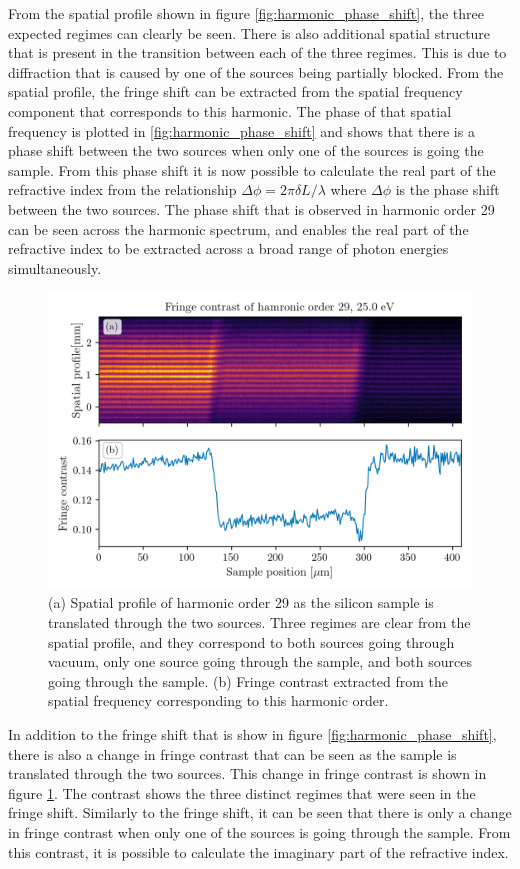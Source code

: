 From the spatial profile shown in figure \ref{fig:harmonic_phase_shift}, the three expected regimes can clearly be seen.  There is also additional spatial structure that is present in the transition between each of the three regimes.  This is due to diffraction that is caused by one of the sources being partially blocked.  From the spatial profile, the fringe shift can be extracted from the spatial frequency component that corresponds to this harmonic.  The phase of that spatial frequency is plotted in \ref{fig:harmonic_phase_shift} and shows that there is a phase shift between the two sources when only one of the sources is going the sample.  From this phase shift it is now possible to calculate the real part of the refractive index from the relationship $\Delta \phi = 2\pi\delta L/\lambda$ where $\Delta \phi$ is the phase shift between the two sources.  The phase shift that is observed in harmonic order 29 can be seen across the harmonic spectrum, and enables the real part of the refractive index to be extracted across a broad range of photon energies simultaneously.

\begin{figure}
	\centering
	\includegraphics[width=1.0\textwidth]{figures/refractive_index/spatialgram_fringe_contrast.png}
	\caption{(a) Spatial profile of harmonic order 29 as the silicon sample is translated through the two sources. Three regimes are clear from the spatial profile, and they correspond to both sources going through vacuum, only one source going through the sample, and both sources going through the sample. (b) Fringe contrast extracted from the spatial frequency corresponding to this harmonic order.}
	\label{fig:harmonic_fringe_contrast}
\end{figure}
In addition to the fringe shift that is show in figure \ref{fig:harmonic_phase_shift}, there is also a change in fringe contrast that can be seen as the sample is translated through the two sources.  This change in fringe contrast is shown in figure \ref{fig:harmonic_fringe_contrast}.  The contrast shows the three distinct regimes that were seen in the fringe shift.  Similarly to the fringe shift, it can be seen that there is only a change in fringe contrast when only one of the sources is going through the sample.  From this contrast, it is possible to calculate the imaginary part of the refractive index. 

